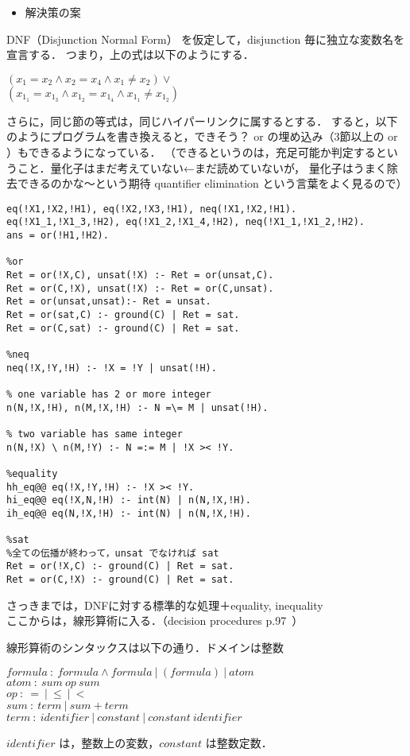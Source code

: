 \begin{itemize}
    \item 解決策の案
\end{itemize}
DNF（Disjunction Normal Form） を仮定して，disjunction 毎に独立な変数名を宣言する．
つまり，上の式は以下のようにする．
\begin{center}
    $(x_1 = x_2 \wedge x_2 = x_4 \wedge x_1 \neq x_2) \vee$\\
    $(x_{1_1} = x_{1_3} \wedge x_{1_2} = x_{1_4} \wedge x_{1_1} \neq x_{1_2})$
\end{center}
さらに，同じ節の等式は，同じハイパーリンクに属するとする．
すると，以下のようにプログラムを書き換えると，できそう？
or の埋め込み（3節以上の or ）もできるようになっている．
（できるというのは，充足可能か判定するということ．量化子はまだ考えていない←まだ読めていないが，
量化子はうまく除去できるのかな～という期待 quantifier elimination という言葉をよく見るので）
\begin{lstlisting}
eq(!X1,!X2,!H1), eq(!X2,!X3,!H1), neq(!X1,!X2,!H1).
eq(!X1_1,!X1_3,!H2), eq(!X1_2,!X1_4,!H2), neq(!X1_1,!X1_2,!H2).
ans = or(!H1,!H2).

%or
Ret = or(!X,C), unsat(!X) :- Ret = or(unsat,C).
Ret = or(C,!X), unsat(!X) :- Ret = or(C,unsat).
Ret = or(unsat,unsat):- Ret = unsat.
Ret = or(sat,C) :- ground(C) | Ret = sat.
Ret = or(C,sat) :- ground(C) | Ret = sat.

%neq
neq(!X,!Y,!H) :- !X = !Y | unsat(!H).

% one variable has 2 or more integer
n(N,!X,!H), n(M,!X,!H) :- N =\= M | unsat(!H).

% two variable has same integer
n(N,!X) \ n(M,!Y) :- N =:= M | !X >< !Y.

%equality
hh_eq@@ eq(!X,!Y,!H) :- !X >< !Y.
hi_eq@@ eq(!X,N,!H) :- int(N) | n(N,!X,!H).
ih_eq@@ eq(N,!X,!H) :- int(N) | n(N,!X,!H).

%sat
%全ての伝播が終わって，unsat でなければ sat
Ret = or(!X,C) :- ground(C) | Ret = sat.
Ret = or(C,!X) :- ground(C) | Ret = sat.
\end{lstlisting}

さっきまでは，DNFに対する標準的な処理＋equality, inequality\\
ここからは，線形算術に入る．（decision procedures p.97~）

線形算術のシンタックスは以下の通り．ドメインは整数
\begin{center}
    $formula\: :\: formula\wedge formula \:|\: (formula) \:|\: atom$\\
    $atom \::\: sum \: op \: sum$\\
    $op \::\: = \:|\: \leq \:|\: <$\\
    $sum \::\: term \:|\: sum+term$\\
    $term \::\: identifier \:|\: constant \:|\: constant \: identifier$
\end{center}
$identifier$ は，整数上の変数，$constant$ は整数定数．

